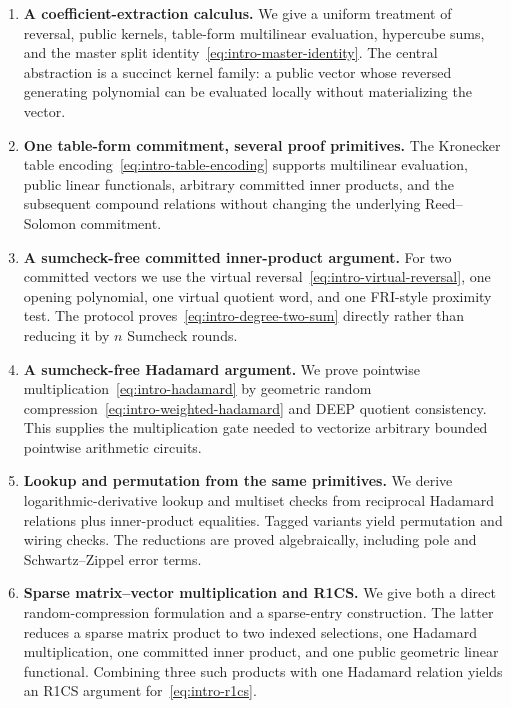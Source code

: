 \begin{enumerate}[leftmargin=*,itemsep=0.5em]
  \item \textbf{A coefficient-extraction calculus.}
  We give a uniform treatment of reversal, public kernels, table-form multilinear evaluation, hypercube sums, and the master split identity~\eqref{eq:intro-master-identity}.  The central abstraction is a succinct kernel family: a public vector whose reversed generating polynomial can be evaluated locally without materializing the vector.

  \item \textbf{One table-form commitment, several proof primitives.}
  The Kronecker table encoding~\eqref{eq:intro-table-encoding} supports multilinear evaluation, public linear functionals, arbitrary committed inner products, and the subsequent compound relations without changing the underlying Reed--Solomon commitment.

  \item \textbf{A sumcheck-free committed inner-product argument.}
  For two committed vectors we use the virtual reversal~\eqref{eq:intro-virtual-reversal}, one opening polynomial, one virtual quotient word, and one FRI-style proximity test.  The protocol proves~\eqref{eq:intro-degree-two-sum} directly rather than reducing it by $n$ Sumcheck rounds.

  \item \textbf{A sumcheck-free Hadamard argument.}
  We prove pointwise multiplication~\eqref{eq:intro-hadamard} by geometric random compression~\eqref{eq:intro-weighted-hadamard} and DEEP quotient consistency.  This supplies the multiplication gate needed to vectorize arbitrary bounded pointwise arithmetic circuits.

  \item \textbf{Lookup and permutation from the same primitives.}
  We derive logarithmic-derivative lookup and multiset checks from reciprocal Hadamard relations plus inner-product equalities.  Tagged variants yield permutation and wiring checks.  The reductions are proved algebraically, including pole and Schwartz--Zippel error terms.

  \item \textbf{Sparse matrix--vector multiplication and R1CS.}
  We give both a direct random-compression formulation and a sparse-entry construction.  The latter reduces a sparse matrix product to two indexed selections, one Hadamard multiplication, one committed inner product, and one public geometric linear functional.  Combining three such products with one Hadamard relation yields an R1CS argument for~\eqref{eq:intro-r1cs}.


\end{enumerate}
